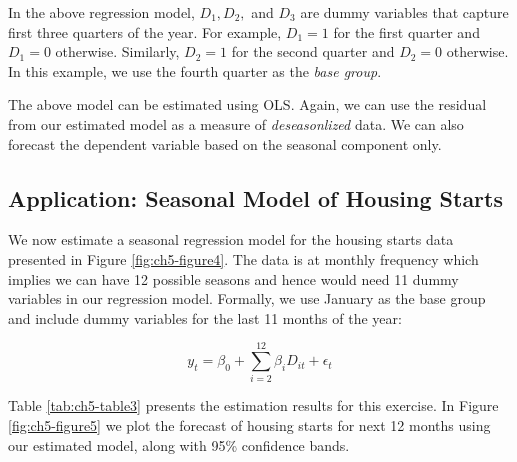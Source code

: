 \documentclass[]{book}
\theoremstyle{definition}
\theoremstyle{definition}
\theoremstyle{definition}
\theoremstyle{remark}
\begin{document}
In the above regression model, \(D_1,D_2,\) and \(D_3\) are dummy
variables that capture first three quarters of the year. For example,
\(D_1=1\) for the first quarter and \(D_1=0\) otherwise. Similarly,
\(D_2=1\) for the second quarter and \(D_2=0\) otherwise. In this
example, we use the fourth quarter as the \emph{base group}.

The above model can be estimated using OLS. Again, we can use the
residual from our estimated model as a measure of \emph{deseasonlized}
data. We can also forecast the dependent variable based on the seasonal
component only.

\hypertarget{application-seasonal-model-of-housing-starts}{%
\subsection{Application: Seasonal Model of Housing
Starts}\label{application-seasonal-model-of-housing-starts}}

We now estimate a seasonal regression model for the housing starts data
presented in Figure \ref{fig:ch5-figure4}. The data is at monthly
frequency which implies we can have 12 possible seasons and hence would
need 11 dummy variables in our regression model. Formally, we use
January as the base group and include dummy variables for the last 11
months of the year:

\begin{equation}
y_t=\beta_0 + \sum_{i=2}^{12}\beta_i D_{it} + \epsilon_t
\end{equation}

Table \ref{tab:ch5-table3} presents the estimation results for this
exercise. In Figure \ref{fig:ch5-figure5} we plot the forecast of
housing starts for next 12 months using our estimated model, along with
95\% confidence bands.
\end{document}
